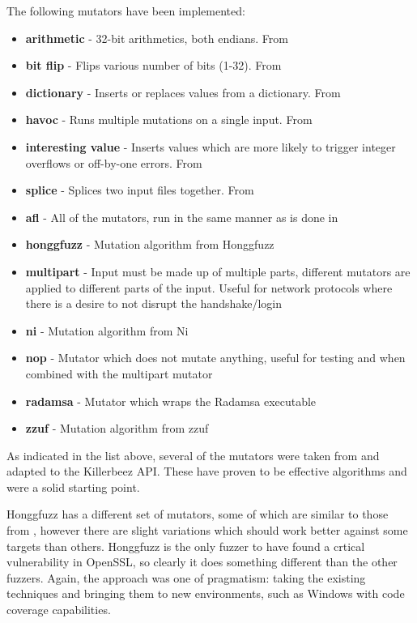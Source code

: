 The following mutators have been implemented:
\begin{itemize}[noitemsep]
\item \textbf{arithmetic} - 32-bit arithmetics, both endians. From \AFL{}
\item \textbf{bit flip} - Flips various number of bits (1-32). From \AFL{}
\item \textbf{dictionary} - Inserts or replaces values from a dictionary. From \AFL{}
\item \textbf{havoc} - Runs multiple mutations on a single input. From \AFL{}
\item \textbf{interesting value} - Inserts values which are more likely to trigger
                                   integer overflows or off-by-one errors. From
                                   \AFL{}
\item \textbf{splice} - Splices two input files together. From \AFL{}
\item \textbf{afl} - All of the \AFL{} mutators, run in the same manner as is
                     done in \AFL{}
\item \textbf{honggfuzz} - Mutation algorithm from Honggfuzz\cite{honggfuzz}
\item \textbf{multipart} - Input must be made up of multiple parts, different
                           mutators are applied to different parts of the
                           input. Useful for network protocols where there is
                           a desire to not disrupt the handshake/login
\item \textbf{ni} - Mutation algorithm from Ni\cite{ni}
\item \textbf{nop} - Mutator which does not mutate anything, useful for
                     testing and when combined with the multipart mutator
\item \textbf{radamsa} - Mutator which wraps the Radamsa\cite{radamsa} executable
\item \textbf{zzuf} - Mutation algorithm from zzuf\cite{zzuf}
\end{itemize}

As indicated in the list above, several of the mutators were taken from \AFL{}
and adapted to the Killerbeez API. These have proven to be effective algorithms
and were a solid starting point.

Honggfuzz has a different set of mutators, some of which are similar to those
from \AFL{}, however there are slight variations which should work better
against some targets than others.  Honggfuzz is the only fuzzer to have found a
crtical vulnerability in OpenSSL,\cite{honggfuzz} so clearly it does
something different than the other fuzzers.  Again, the approach was one of pragmatism:
taking the existing techniques and bringing them to new
environments, such as Windows with code coverage capabilities.

